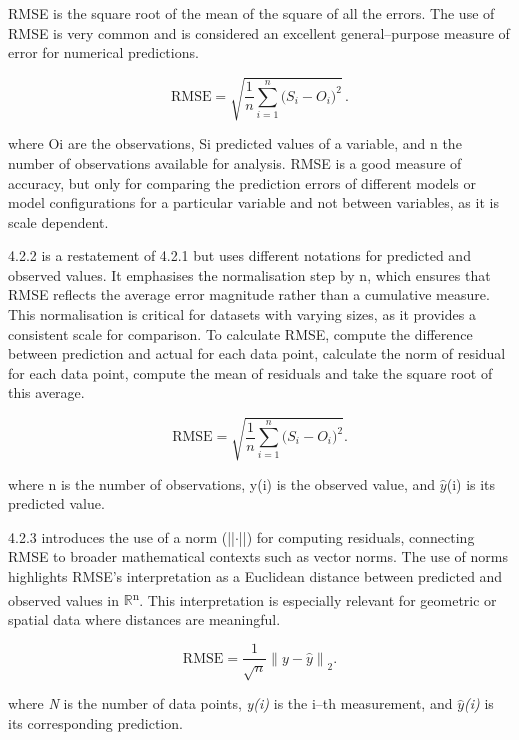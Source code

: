 \documentclass[12pt,a4paper]{report}
\numberwithin{equation}{section}
\begin{document}
RMSE is the square root of the mean of the square of all the errors. The
use of RMSE is very common and is considered an excellent
general--purpose measure of error for numerical predictions.

\begin{equation}\label{eq:4.1.1}
\mathrm{RMSE}
= \sqrt{\frac{1}{n}\sum_{i=1}^{n}\bigl(S_i - O_i\bigr)^{2}} \, .
\end{equation}

where Oi are the observations, Si predicted values of a variable, and n
the number of observations available for analysis. RMSE is a good
measure of accuracy, but only for comparing the prediction errors of
different models or model configurations for a particular variable and
not between variables, as it is scale dependent.

4.2.2 is a restatement of 4.2.1 but uses different notations for
predicted and observed values. It emphasises the normalisation step by
n, which ensures that RMSE reflects the average error magnitude rather
than a cumulative measure. This normalisation is critical for datasets
with varying sizes, as it provides a consistent scale for comparison. To
calculate RMSE, compute the difference between prediction and actual for
each data point, calculate the norm of residual for each data point,
compute the mean of residuals and take the square root of this average.

\begin{equation}\label{eq:4.1.1}
\mathrm{RMSE}
= \sqrt{\frac{1}{n}\sum_{i=1}^{n}\bigl(S_i - O_i\bigr)^{2}}.
\end{equation}


where n is the number of observations, y(i) is the observed value, and
$\hat{y}$(i) is its predicted value.

4.2.3 introduces the use of a norm (||$\cdot$||) for computing residuals,
connecting RMSE to broader mathematical contexts such as vector norms.
The use of norms highlights RMSE's interpretation as a Euclidean
distance between predicted and observed values in $\mathbb{R}$\textsuperscript{n}. This
interpretation is especially relevant for geometric or spatial data
where distances are meaningful.

\begin{equation}\label{eq:4.1.3}
\mathrm{RMSE}
= \frac{1}{\sqrt{n}}\left\lVert y-\widehat{y}\right\rVert_2 .
\end{equation}



where \emph{N} is the number of data points, \emph{y(i)} is the i--th
measurement, and \emph{$\hat{y}$(i)} is its corresponding prediction.
\end{document}
